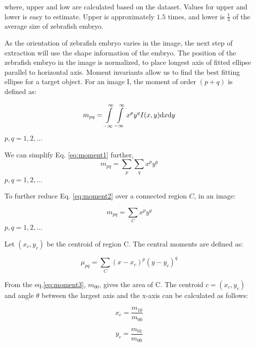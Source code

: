 where, upper and low are calculated based on the dataset. Values for upper and lower is easy to estimate. Upper is approximately $1.5$ times, and lower is $\frac{1}{3}$ of the average size of zebrafish embryo.

As the orientation of zebrafish embryo varies in the image, the next step of extraction will use the shape information of the embryo. The position of the zebrafish embryo in the image is normalized, to place longest axis of fitted ellipse parallel to horizontal axis. Moment invariants allow us to find the best fitting ellipse for a target object. 
For an image I, the moment of order $(p + q)$ is defined as:

\begin{equation}
m_{pq} = \int\limits_{\vphantom{b}{-\infty}}^{\infty} \int\limits_{-\infty}^{\infty} x^p y^q I(x,y)\mathrm{d}x \mathrm{d}y 
\label{eq:moment1}
\end{equation}
$p,q = 1,2,\ldots$

We can simplify Eq. \eqref{eq:moment1} further,
\begin{equation} 
m_{pq} = \sum_{p}\sum_{q} x^p y^q
\label{eq:moment2}
\end{equation}
$p,q = 1,2,\ldots$

To further reduce Eq. \eqref{eq:moment2}  over a connected region $C$, in an image:

\begin{equation} 
m_{pq} = \sum_{C} x^p y^q
\label{eq:moment3}
\end{equation}
$p,q = 1,2,\ldots$

Let $(x_{c}, y_{c})$ be the centroid of region C. The central moments are defined as:

\begin{equation}
\mu_{pq} = \sum_{C} (x - x_{c})^p (y - y_{c})^q
\end{equation}

From the eq.\eqref{eq:moment3}, $m_{00}$, gives the area of C. The centroid $c = (x_{c}, y_{c})$ and angle $\theta$ between the largest axis and the x-axis can be calculated as follows:

\begin{displaymath} x_{c} = \frac{m_{10}}{m_{00}}\end{displaymath}

\begin{displaymath}y_{c} = \frac{m_{01}}{m_{00}}\end{displaymath}

